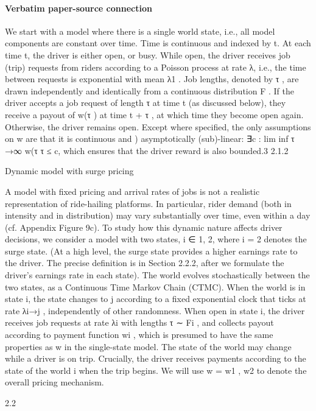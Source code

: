 \documentclass[10pt]{article}
\begin{document}
\paragraph{Verbatim paper-source connection}
\begin{ReviewVerbatim}
We start with a model where there is a single world state, i.e., all model components are constant
over time. Time is continuous and indexed by t. At each time t, the driver is either open, or busy.
While open, the driver receives job (trip) requests from riders according to a Poisson process at
rate λ, i.e., the time between requests is exponential with mean λ1 . Job lengths, denoted by τ , are
drawn independently and identically from a continuous distribution F .
If the driver accepts a job request of length τ at time t (as discussed below), they receive
a payout of w(τ ) at time t + τ , at which time they become open again. Otherwise, the driver
remains open. Except where specified, the only assumptions on w are that it is continuous and
)
asymptotically (sub)-linear: ∃c : lim inf τ →∞ w(τ
τ ≤ c, which ensures that the driver reward is also
bounded.3
2.1.2

Dynamic model with surge pricing

A model with fixed pricing and arrival rates of jobs is not a realistic representation of ride-hailing
platforms. In particular, rider demand (both in intensity and in distribution) may vary substantially
over time, even within a day (cf. Appendix Figure 9c). To study how this dynamic nature affects
driver decisions, we consider a model with two states, i ∈ {1, 2}, where i = 2 denotes the surge
state. (At a high level, the surge state provides a higher earnings rate to the driver. The precise
definition is in Section 2.2.2, after we formulate the driver’s earnings rate in each state).
The world evolves stochastically between the two states, as a Continuous Time Markov Chain
(CTMC). When the world is in state i, the state changes to j according to a fixed exponential clock
that ticks at rate λi→j , independently of other randomness.
When open in state i, the driver receives job requests at rate λi with lengths τ ∼ Fi , and collects
payout according to payment function wi , which is presumed to have the same properties as w in
the single-state model. The state of the world may change while a driver is on trip. Crucially, the
driver receives payments according to the state of the world i when the trip begins. We will use
w = {w1 , w2 } to denote the overall pricing mechanism.

2.2


\end{ReviewVerbatim}
\end{document}
